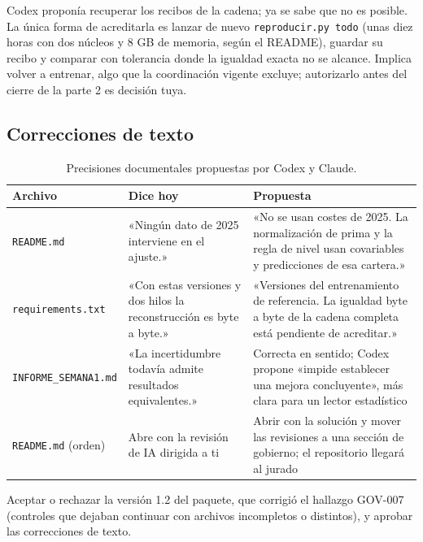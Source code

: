 \documentclass[11pt,a4paper]{article}
\newcommand{\archivo}[1]{\texttt{\small #1}}
\begin{document}
\begin{pendiente}
Codex proponía recuperar los recibos de la cadena; ya se sabe que no es posible. La única forma de acreditarla es lanzar de nuevo \archivo{reproducir.py todo} (unas diez horas con dos núcleos y 8 GB de memoria, según el README), guardar su recibo y comparar con tolerancia donde la igualdad exacta no se alcance. Implica volver a entrenar, algo que la coordinación vigente excluye; autorizarlo antes del cierre de la parte 2 es decisión tuya.
\end{pendiente}

\subsection{Correcciones de texto}

\begin{table}[H]
\centering\small
\begin{tabularx}{\linewidth}{@{}P{3.2cm}LL@{}}
\toprule
Archivo & Dice hoy & Propuesta \\
\midrule
\archivo{README.md} & «Ningún dato de 2025 interviene en el ajuste.» & «No se usan costes de 2025. La normalización de prima y la regla de nivel usan covariables y predicciones de esa cartera.» \\
\archivo{requirements.txt} & «Con estas versiones y dos hilos la reconstrucción es byte a byte.» & «Versiones del entrenamiento de referencia. La igualdad byte a byte de la cadena completa está pendiente de acreditar.» \\
\archivo{INFORME\_SEMANA1.md} & «La incertidumbre todavía admite resultados equivalentes.» & Correcta en sentido; Codex propone «impide establecer una mejora concluyente», más clara para un lector estadístico \\
\archivo{README.md} (orden) & Abre con la revisión de IA dirigida a ti & Abrir con la solución y mover las revisiones a una sección de gobierno; el repositorio llegará al jurado \\
\bottomrule
\end{tabularx}
\caption{Precisiones documentales propuestas por Codex y Claude.}
\end{table}

\begin{pendiente}
Aceptar o rechazar la versión 1.2 del paquete, que corrigió el hallazgo GOV-007 (controles que dejaban continuar con archivos incompletos o distintos), y aprobar las correcciones de texto.
\end{pendiente}
\end{document}
